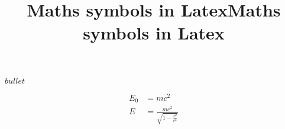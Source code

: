 \documentclass{article}
\title{Maths symbols in Latex}
\begin{document}
\title{Maths symbols in Latex}


$bullet$



  \begin{align}
    E_0 &= mc^2 \\
    E &= \frac{mc^2}{\sqrt{1-\frac{v^2}{c^2}}}
  \end{align} 
  
  
  
  
  
  
\end{document}

